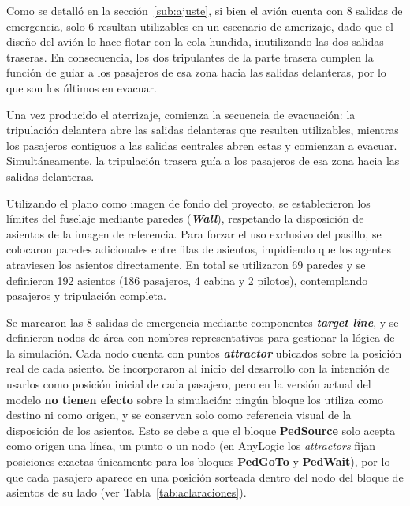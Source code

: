 \documentclass[a4paper, 11pt]{article}
\begin{document}
Como se detall\'o en la secci\'on~\ref{sub:ajuste}, si bien el avi\'on cuenta con 8 salidas de
emergencia, solo 6 resultan utilizables en un escenario de amerizaje, dado que el
dise\~no del avi\'on lo hace flotar con la cola hundida, inutilizando las dos
salidas traseras. En consecuencia, los dos tripulantes de la parte trasera cumplen
la funci\'on de guiar a los pasajeros de esa zona hacia las salidas delanteras, por
lo que son los \'ultimos en evacuar.

Una vez producido el aterrizaje, comienza la secuencia de evacuaci\'on: la
tripulaci\'on delantera abre las salidas delanteras que resulten utilizables,
mientras los pasajeros contiguos a las salidas centrales abren estas y comienzan a
evacuar. Simult\'aneamente, la tripulaci\'on trasera gu\'ia a los pasajeros de esa
zona hacia las salidas delanteras.

Utilizando el plano como imagen de fondo del proyecto, se establecieron los
l\'imites del fuselaje mediante paredes (\textbf{\textit{Wall}}), respetando la
disposici\'on de asientos de la imagen de referencia. Para forzar el uso exclusivo
del pasillo, se colocaron paredes adicionales entre filas de asientos, impidiendo
que los agentes atraviesen los asientos directamente. En total se utilizaron 69
paredes y se definieron 192 asientos (186 pasajeros, 4 cabina y 2 pilotos),
contemplando pasajeros y tripulaci\'on completa.

Se marcaron las 8 salidas de emergencia mediante componentes \textbf{\textit{target
line}}, y se definieron nodos de \'area con nombres representativos para gestionar
la l\'ogica de la simulaci\'on. Cada nodo cuenta con puntos \textbf{\textit{attractor}} ubicados sobre la
posici\'on real de cada asiento. Se incorporaron al inicio del desarrollo con la
intenci\'on de usarlos como posici\'on inicial de cada pasajero, pero en la versi\'on
actual del modelo \textbf{no tienen efecto} sobre la simulaci\'on: ning\'un bloque los
utiliza como destino ni como origen, y se conservan solo como referencia visual de
la disposici\'on de los asientos. Esto se debe a que el bloque \textbf{PedSource}
solo acepta como origen una l\'inea, un punto o un nodo (en AnyLogic los
\textit{attractors} fijan posiciones exactas \'unicamente para los bloques
\textbf{PedGoTo} y \textbf{PedWait}), por lo que cada pasajero aparece en una
posici\'on sorteada dentro del nodo del bloque de asientos de su lado (ver
Tabla~\ref{tab:aclaraciones}).
\end{document}
